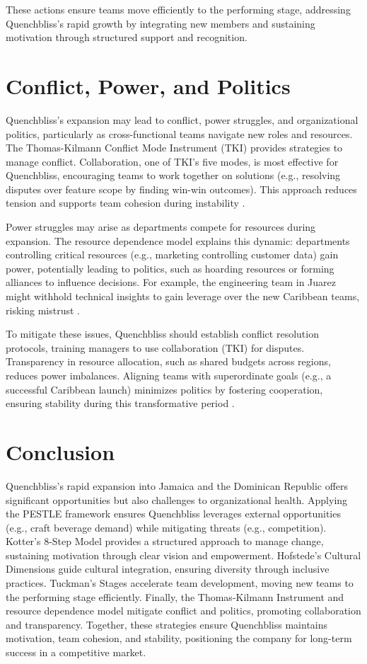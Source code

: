 \documentclass[12pt]{article}
\begin{document}
These actions ensure teams move efficiently to the performing stage, addressing Quenchbliss’s rapid growth by integrating new members and sustaining motivation through structured support and recognition.

\section{Conflict, Power, and Politics}
Quenchbliss’s expansion may lead to conflict, power struggles, and organizational politics, particularly as cross-functional teams navigate new roles and resources. The Thomas-Kilmann Conflict Mode Instrument (TKI) provides strategies to manage conflict. Collaboration, one of TKI’s five modes, is most effective for Quenchbliss, encouraging teams to work together on solutions (e.g., resolving disputes over feature scope by finding win-win outcomes). This approach reduces tension and supports team cohesion during instability \citep{sophia_conflict}.

Power struggles may arise as departments compete for resources during expansion. The resource dependence model explains this dynamic: departments controlling critical resources (e.g., marketing controlling customer data) gain power, potentially leading to politics, such as hoarding resources or forming alliances to influence decisions. For example, the engineering team in Juarez might withhold technical insights to gain leverage over the new Caribbean teams, risking mistrust \citep{sophia_politics}.

To mitigate these issues, Quenchbliss should establish conflict resolution protocols, training managers to use collaboration (TKI) for disputes. Transparency in resource allocation, such as shared budgets across regions, reduces power imbalances. Aligning teams with superordinate goals (e.g., a successful Caribbean launch) minimizes politics by fostering cooperation, ensuring stability during this transformative period \citep{sophia_response}.

\section*{Conclusion}
Quenchbliss’s rapid expansion into Jamaica and the Dominican Republic offers significant opportunities but also challenges to organizational health. Applying the PESTLE framework ensures Quenchbliss leverages external opportunities (e.g., craft beverage demand) while mitigating threats (e.g., competition). Kotter’s 8-Step Model provides a structured approach to manage change, sustaining motivation through clear vision and empowerment. Hofstede’s Cultural Dimensions guide cultural integration, ensuring diversity through inclusive practices. Tuckman’s Stages accelerate team development, moving new teams to the performing stage efficiently. Finally, the Thomas-Kilmann Instrument and resource dependence model mitigate conflict and politics, promoting collaboration and transparency. Together, these strategies ensure Quenchbliss maintains motivation, team cohesion, and stability, positioning the company for long-term success in a competitive market.

\printbibliography[title=References]
\end{document}

